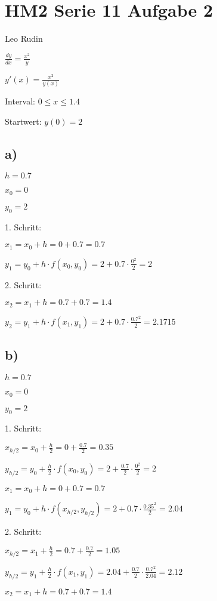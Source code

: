 \documentclass{article}
\begin{document}
\section*{HM2 Serie 11 Aufgabe 2}
Leo Rudin

\(\frac{dy}{dx} = \frac{x^2}{y}\)

\(y'(x) = \frac{x^2}{y(x)}\)

Interval: \(0 \leq x \leq 1.4\)

Startwert: \(y(0) = 2\)

\subsection*{a)}

\(h = 0.7\)

\(x_0 = 0\)

\(y_0 = 2\)

1. Schritt:

\(x_1 = x_0 + h = 0 + 0.7 = 0.7\)

\(y_1 = y_0 + h \cdot f(x_0,y_0) = 2 + 0.7 \cdot \frac{0^2}{2} = 2\)

2. Schritt:

\(x_2 = x_1 + h = 0.7 + 0.7 = 1.4\)

\(y_2 = y_1 + h \cdot f(x_1,y_1) = 2 + 0.7 \cdot \frac{0.7^2}{2} = 2.1715\)

\subsection*{b)}

\(h = 0.7\)

\(x_0 = 0\)

\(y_0 = 2\)

1. Schritt:

\(x_{h/2} = x_0 + \frac{h}{2} = 0 + \frac{0.7}{2} = 0.35\)

\(y_{h/2} = y_0 + \frac{h}{2} \cdot f(x_0,y_0) = 2 + \frac{0.7}{2} \cdot \frac{0^2}{2} = 2\)

\(x_{1} = x_0 + h = 0 + 0.7 = 0.7\)

\(y_{1} = y_0 + h \cdot f(x_{h/2},y_{h/2}) = 2 + 0.7 \cdot \frac{0.35^2}{2} = 2.04\)

2. Schritt:

\(x_{h/2} = x_1 + \frac{h}{2} = 0.7 + \frac{0.7}{2} = 1.05\)

\(y_{h/2} = y_1 + \frac{h}{2} \cdot f(x_1,y_1) = 2.04 + \frac{0.7}{2} \cdot \frac{0.7^2}{2.04} = 2.12\)

\(x_2 = x_1 + h = 0.7 + 0.7 = 1.4\)
\end{document}
